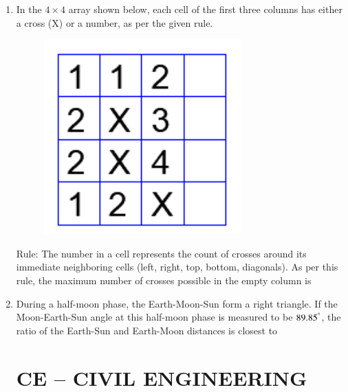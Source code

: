 \documentclass[journal]{IEEEtran}
\begin{document}
\begin{enumerate}
\item In the $4 \times 4$ array shown below, each cell of the first three columns has either a cross (X) or a number, as per the given rule.  

\begin{figure}[H]
    \centering
    \includegraphics[width=0.3\columnwidth]{figs/Q9.png} 
    \caption{}
    \label{fig:placeholder}
\end{figure}

Rule: The number in a cell represents the count of crosses around its immediate neighboring cells (left, right, top, bottom, diagonals).  
As per this rule, the maximum number of crosses possible in the empty column is  
\hfill {}  
\begin{enumerate}
\end{enumerate}

\item During a half-moon phase, the Earth-Moon-Sun form a right triangle. If the Moon-Earth-Sun angle at this half-moon phase is measured to be $89.85^\degree$, the ratio of the Earth-Sun and Earth-Moon distances is closest to  
\hfill {}  
\begin{enumerate}
\end{enumerate}

\section*{CE -- CIVIL ENGINEERING}


\end{enumerate}
\end{document}
